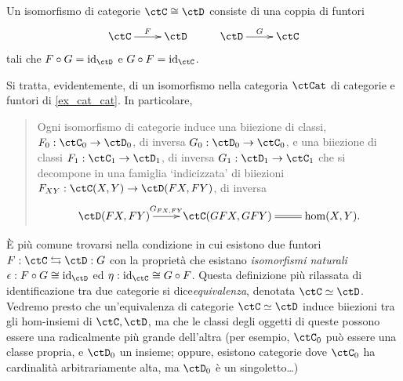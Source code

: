 \begin{definition}\label{fun_isocat}
	Un isomorfismo di categorie \(\ctC\cong\ctD\) consiste di una coppia di funtori
	\[\xymatrix{
			\ctC \ar[r]^-F & \ctD & \ctD \ar[r]^-G & \ctC
		}\]
	tali che \(F\cmp G = \Id[\ctD]\) e \(G\cmp F = \Id[\ctC]\).

	Si tratta, evidentemente, di un isomorfismo nella categoria \(\ctCat\) di categorie e funtori di \ref{ex_cat_cat}. In particolare,
	\begin{quote}
		Ogni isomorfismo di categorie induce una biiezione di classi, \(F_0 : \ctC_0\to\ctD_0\), di inversa \(G_0 : \ctD_0\to\ctC_0\), e una biiezione di classi \(F_1 : \ctC_1 \to \ctD_1\), di inversa \(G_1 : \ctD_1\to\ctC_1\) che si decompone in una famiglia `indicizzata' di biiezioni \(F_{XY} : \Hom\ctC(X,Y)\to\Hom\ctD(FX,FY)\), di inversa
		\[\xymatrix{
			\Hom\ctD(FX,FY) \ar[r]^-{G_{FX,FY}} & \Hom\ctC(GFX,GFY) \ar@{=}[r] & \hom(X,Y).
			}\]
	\end{quote}
\end{definition}
\`E più comune trovarsi nella condizione in cui esistono due funtori \(F : \ctC \leftrightarrows \ctD: G\) con la proprietà che esistano \emph{isomorfismi naturali} \(\epsilon : F\cmp G \cong \Id[\ctD]\) ed \(\eta : \Id[\ctC]\cong G\cmp F\). Questa definizione più rilassata di identificazione tra due categorie si dice\emph{equivalenza}, denotata \(\ctC\simeq\ctD\). Vedremo presto che un'equivalenza di categorie \(\ctC\simeq\ctD\) induce biiezioni tra gli hom-insiemi di \(\ctC,\ctD\), ma che le classi degli oggetti di queste possono essere una radicalmente più grande dell'altra (per esempio, \(\ctC_0\) può essere una classe propria, e \(\ctD_0\) un insieme; oppure, esistono categorie dove \(\ctC_0\) ha cardinalità arbitrariamente alta, ma \(\ctD_0\) è un singoletto\dots)
